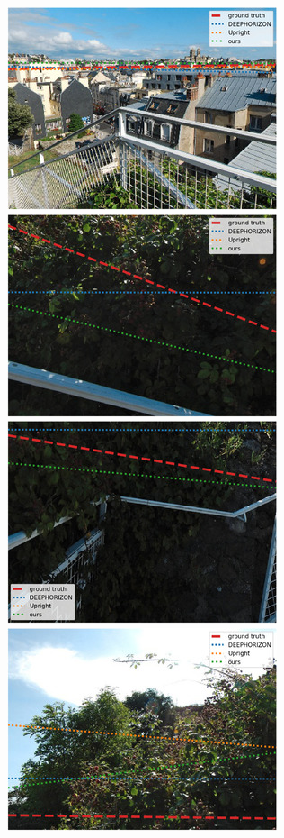\includegraphics{horizon_estimation/thumb/pano_addkkzvqqxujqf-0.jpg}
\includegraphics{horizon_estimation/thumb/pano_addkkzvqqxujqf-3.jpg}
\includegraphics{horizon_estimation/thumb/pano_addkkzvqqxujqf-4.jpg}
\includegraphics{horizon_estimation/thumb/pano_addkkzvqqxujqf-6.jpg}
